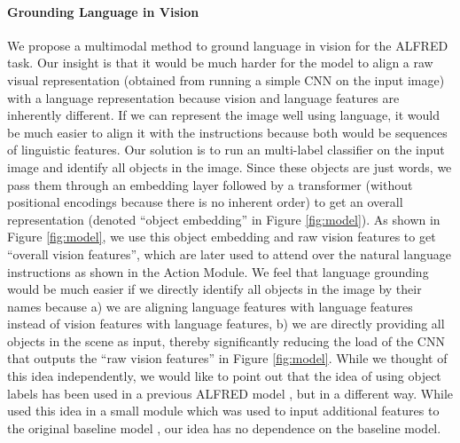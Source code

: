 \documentclass[11pt,a4paper]{article}
\begin{document}
\paragraph{Grounding Language in Vision}
We propose a multimodal method to ground language in vision for the ALFRED task. Our insight is that it would be much harder for the model to align a raw visual representation (obtained from running a simple CNN on the input image) with a language representation because vision and language features are inherently different. If we can represent the image well using language, it would be much easier to align it with the instructions because both would be sequences of linguistic features. Our solution is to run an multi-label classifier on the input image and identify all objects in the image. Since these objects are just words, we pass them through an embedding layer followed by a transformer (without positional encodings because there is no inherent order) to get an overall representation (denoted ``object embedding'' in Figure \ref{fig:model}). As shown in Figure \ref{fig:model}, we use this object embedding and raw vision features to get ``overall vision features'', which are later used to attend over the natural language instructions as shown in the Action Module. We feel that language grounding would be much easier if we directly identify all objects in the image by their names because a) we are aligning language features with language features instead of vision features with language features, b) we are directly providing all objects in the scene as input, thereby significantly reducing the load of the CNN that outputs the ``raw vision features'' in Figure \ref{fig:model}. While we thought of this idea independently, we would like to point out that the idea of using object labels has been used in a previous ALFRED model \cite{Storks2021AreWT}, but in a different way. While  used this idea in a small module which was used to input additional features to the original baseline model \cite{shridhar2020alfred}, our idea has no dependence on the baseline model.
\end{document}
